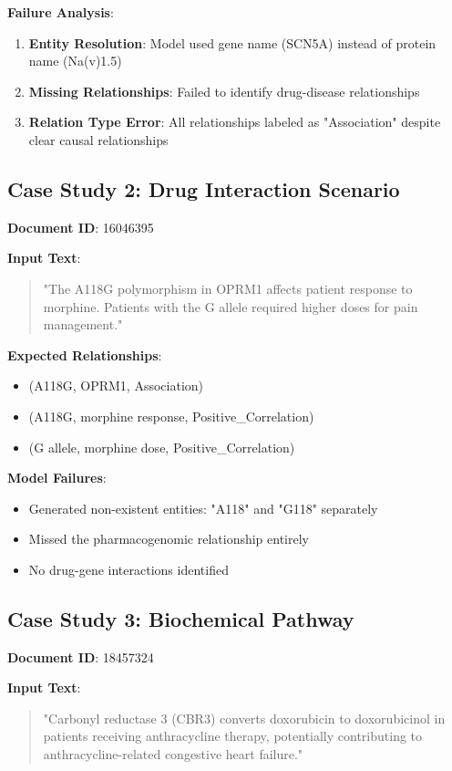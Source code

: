 \textbf{Failure Analysis}:
\begin{enumerate}
    \item \textbf{Entity Resolution}: Model used gene name (SCN5A) instead of protein name (Na(v)1.5)
    \item \textbf{Missing Relationships}: Failed to identify drug-disease relationships
    \item \textbf{Relation Type Error}: All relationships labeled as "Association" despite clear causal relationships
\end{enumerate}

\subsection{Case Study 2: Drug Interaction Scenario}

\textbf{Document ID}: 16046395

\textbf{Input Text}:
\begin{quote}
"The A118G polymorphism in OPRM1 affects patient response to morphine. Patients with the G allele required higher doses for pain management."
\end{quote}

\textbf{Expected Relationships}:
\begin{itemize}
    \item (A118G, OPRM1, Association)
    \item (A118G, morphine response, Positive\_Correlation)
    \item (G allele, morphine dose, Positive\_Correlation)
\end{itemize}

\textbf{Model Failures}:
\begin{itemize}
    \item Generated non-existent entities: "A118" and "G118" separately
    \item Missed the pharmacogenomic relationship entirely
    \item No drug-gene interactions identified
\end{itemize}

\subsection{Case Study 3: Biochemical Pathway}

\textbf{Document ID}: 18457324

\textbf{Input Text}:
\begin{quote}
"Carbonyl reductase 3 (CBR3) converts doxorubicin to doxorubicinol in patients receiving anthracycline therapy, potentially contributing to anthracycline-related congestive heart failure."
\end{quote}

